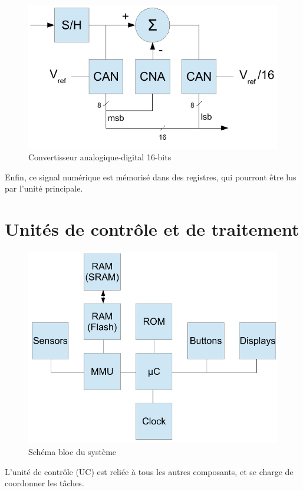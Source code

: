 \documentclass[a4paper,oneside,11pt]{article}  %
\begin{document}
\begin{figure}[h!]
	\centering
	\includegraphics[scale=0.8]{can.pdf}
	\caption{Convertisseur analogique-digital 16-bits}
\end{figure}

Enfin, ce signal numérique est mémorisé dans des registres, qui pourront être lus par l'unité principale.


\section{Unités de contrôle et de traitement}

\begin{figure}[h!]
	\centering
	\includegraphics[scale=0.8]{uc.pdf}
	\caption{Schéma bloc du système}
\end{figure}

L'unité de contrôle (UC) est reliée à tous les autres composants, et se charge de coordonner les tâches.
\end{document}

